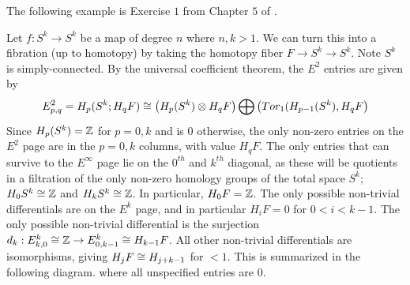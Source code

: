 The following example is Exercise $1$ from Chapter $5$ of \cite{Hatcher-spec}.
\begin{example}
Let $f:S^k\rightarrow S^k$ be a map of degree $n$ where $n,k>1$. We can turn this into a fibration (up to homotopy) by taking the homotopy fiber $F\rightarrow S^k\rightarrow S^k$. Note $S^k$ is simply-connected. By the universal coefficient theorem, the $E^2$ entries are given by
$$E_{p,q}^2=H_p(S^k;H_qF)\cong \big(H_p(S^k)\otimes H_qF\big)\bigoplus\big(Tor_1(H_{p-1}(S^k),H_qF\big)$$
Since $H_p(S^k)=\mathbb{Z}$ for $p=0,k$ and is $0$ otherwise, the only non-zero entries on the $E^2$ page are in the $p=0,k$ columns, with value $H_qF$. The only entries that can survive to the $E^\infty$ page lie on the $0^{th}$ and $k^{th}$ diagonal, as these will be quotients in a filtration of the only non-zero homology groups of the total space $S^k$; $H_0S^k\cong \mathbb{Z}$ and $H_kS^k\cong \mathbb{Z}$. In particular, $H_0F=\mathbb{Z}$. The only possible non-trivial differentials are on the $E^k$ page, and in particular $H_iF=0$ for $0<i<k-1$. The only possible non-trivial differential is the surjection $d_k:E_{k,0}^k\cong \mathbb{Z}\rightarrow E^k_{0,k-1}\cong H_{k-1}F$. All other non-trivial differentials are isomorphisms, giving $H_jF\cong H_{j+k-1}$ for $<1$. This is summarized in the following diagram. where all unspecified entries are $0$.


\end{example}
